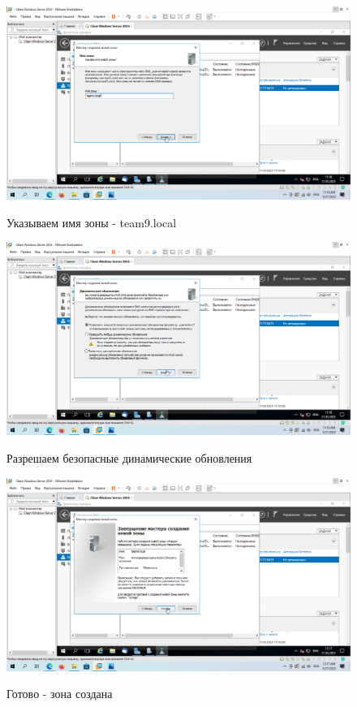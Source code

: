 \documentclass[a4paper]{article}
\begin{document}
  \begin{figure}[H]
    \centering
    \includegraphics[width=\textwidth]{11_0076}
    \label{img:76}
    \caption{Указываем имя зоны - team9.local}
  \end{figure}

  \begin{figure}[H]
    \centering
    \includegraphics[width=\textwidth]{11_0077}
    \label{img:77}
    \caption{Разрешаем безопасные динамические обновления}
  \end{figure}

  \begin{figure}[H]
    \centering
    \includegraphics[width=\textwidth]{11_0078}
    \label{img:78}
    \caption{Готово - зона создана}
  \end{figure}
\end{document}
